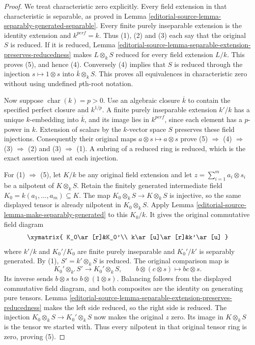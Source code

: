 \begin{proof}
We treat characteristic zero explicitly. Every field
extension in that characteristic is separable, as
proved in Lemma \ref{editorial-source-lemma-separably-generated-separable}.
Every finite purely inseparable extension is the
identity extension and $k^{perf}=k$. Thus (1), (2)
and (3) each say that the original $S$ is reduced.
If it is reduced, Lemma
\ref{editorial-source-lemma-separable-extension-preserves-reducedness}
makes $L\otimes_k S$ reduced for every field
extension $L/k$. This proves (5), and hence (4).
Conversely (4) implies that $S$ is reduced through
the injection $s\mapsto1\otimes s$ into
$\overline k\otimes_k S$. This proves all equivalences
in characteristic zero without using undefined
$p$th-root notation.

Now suppose $\operatorname{char}(k)=p>0$. Use an
algebraic closure $\overline k$ to contain the
specified perfect closure and $k^{1/p}$. A finite
purely inseparable extension $k'/k$ has a unique
$k$-embedding into $\overline k$, and its image lies
in $k^{perf}$, since each element has a $p$-power
in $k$. Extension of scalars by the $k$-vector
space $S$ preserves these field injections.
Consequently their original maps
$a\otimes s\mapsto a\otimes s$ prove
(5) $\Rightarrow$ (4) $\Rightarrow$ (3) $\Rightarrow$ (2)
and (3) $\Rightarrow$ (1). A subring of a reduced
ring is reduced, which is the exact assertion
used at each injection.

For (1) $\Rightarrow$ (5), let $K/k$ be any original
field extension and let $z=\sum_{i=1}^m a_i\otimes s_i$
be a nilpotent of $K\otimes_k S$. Retain the
finitely generated intermediate field
$K_0=k(a_1,\ldots,a_m)\subseteq K$. The map
$K_0\otimes_k S\to K\otimes_k S$ is injective,
so the same displayed tensor is already nilpotent
in $K_0\otimes_k S$. Apply Lemma
\ref{editorial-source-lemma-make-separably-generated} to this $K_0/k$.
It gives the original commutative field diagram
$$
\xymatrix{
K_0\ar[r]&K_0'\\
k\ar[u]\ar[r]&k'\ar[u]
}
$$
where $k'/k$ and $K_0'/K_0$ are finite purely
inseparable and $K_0'/k'$ is separably generated.
By (1), $S'=k'\otimes_k S$ is reduced. The original
comparison map is
$$
K_0'\otimes_{k'}S'\longrightarrow K_0'\otimes_k S,
\qquad b\otimes(c\otimes s)\longmapsto bc\otimes s.
$$
Its inverse sends $b\otimes s$ to
$b\otimes(1\otimes s)$. Balancing follows from
the displayed commutative field diagram, and
both composites are the identity on generating
pure tensors. Lemma
\ref{editorial-source-lemma-separable-extension-preserves-reducedness}
makes the left side reduced, so the right side
is reduced. The injection
$K_0\otimes_k S\to K_0'\otimes_k S$ now makes
the original $z$ zero. Its image in $K\otimes_k S$
is the tensor we started with. Thus every
nilpotent in that original tensor ring is zero,
proving (5).


\end{proof}
